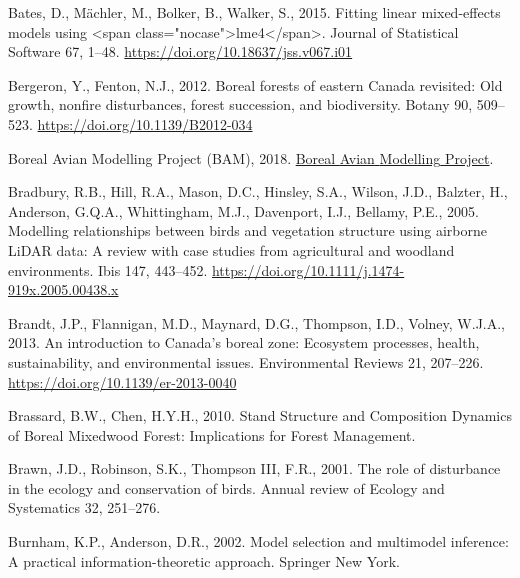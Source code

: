 \documentclass[
]{article}
\newlength{\cslhangindent}
\newlength{\cslentryspacingunit} %
\newenvironment{CSLReferences}[2] %
 {%
  \setlength{\parindent}{0pt}
  \ifodd #1
  \let\oldpar\par
  \def\par{\hangindent=\cslhangindent\oldpar}
  \fi
  \setlength{\parskip}{#2\cslentryspacingunit}
 }%
 {}
\begin{document}
\begin{CSLReferences}{1}{0}
\leavevmode{}%
Bates, D., Mächler, M., Bolker, B., Walker, S., 2015. Fitting linear mixed-effects models using {\textless{}}span class="nocase"{\textgreater{}}lme4{\textless{}}/span{\textgreater{}}. Journal of Statistical Software 67, 1--48. \url{https://doi.org/10.18637/jss.v067.i01}

\leavevmode{}%
Bergeron, Y., Fenton, N.J., 2012. Boreal forests of eastern {Canada} revisited: {Old} growth, nonfire disturbances, forest succession, and biodiversity. Botany 90, 509--523. \url{https://doi.org/10.1139/B2012-034}

\leavevmode{}%
Boreal Avian Modelling Project (BAM), 2018. \href{http://www.borealbirds.ca/}{Boreal {Avian} {Modelling} {Project}}.

\leavevmode{}%
Bradbury, R.B., Hill, R.A., Mason, D.C., Hinsley, S.A., Wilson, J.D., Balzter, H., Anderson, G.Q.A., Whittingham, M.J., Davenport, I.J., Bellamy, P.E., 2005. Modelling relationships between birds and vegetation structure using airborne {LiDAR} data: A review with case studies from agricultural and woodland environments. Ibis 147, 443--452. \url{https://doi.org/10.1111/j.1474-919x.2005.00438.x}

\leavevmode{}%
Brandt, J.P., Flannigan, M.D., Maynard, D.G., Thompson, I.D., Volney, W.J.A., 2013. An introduction to {Canada}'s boreal zone: {Ecosystem} processes, health, sustainability, and environmental issues. Environmental Reviews 21, 207--226. \url{https://doi.org/10.1139/er-2013-0040}

\leavevmode{}%
Brassard, B.W., Chen, H.Y.H., 2010. Stand {Structure} and {Composition} {Dynamics} of {Boreal} {Mixedwood} {Forest}: {Implications} for {Forest} {Management}.

\leavevmode{}%
Brawn, J.D., Robinson, S.K., Thompson III, F.R., 2001. The role of disturbance in the ecology and conservation of birds. Annual review of Ecology and Systematics 32, 251--276.

\leavevmode{}%
Burnham, K.P., Anderson, D.R., 2002. Model selection and multimodel inference: {A} practical information-theoretic approach. Springer New York.


\end{CSLReferences}
\end{document}
